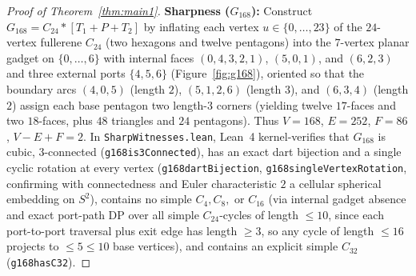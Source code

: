 \documentclass[11pt,reqno]{amsart}
\theoremstyle{plain}
\theoremstyle{definition}
\theoremstyle{remark}
\DeclareRobustCommand{\_}{\ifmmode\text{\textunderscore}\else\textunderscore\allowbreak\fi}
\begin{document}
\begin{proof}[Proof of Theorem~\ref{thm:main1}]
\textbf{Sharpness ($G_{168}$):} Construct $G_{168} = C_{24} * [T_1 + P + T_2]$ by inflating each vertex $u \in \{0,\dots,23\}$ of the $24$-vertex fullerene $C_{24}$ (two hexagons and twelve pentagons) into the $7$-vertex planar gadget on $\{0,\dots,6\}$ with internal faces $(0,4,3,2,1)$, $(5,0,1)$, and $(6,2,3)$ and three external ports $\{4,5,6\}$ (Figure~\ref{fig:g168}), oriented so that the boundary arcs $(4,0,5)$ (length $2$), $(5,1,2,6)$ (length $3$), and $(6,3,4)$ (length $2$) assign each base pentagon two length-$3$ corners (yielding twelve $17$-faces and two $18$-faces, plus $48$ triangles and $24$ pentagons). Thus $V = 168$, $E = 252$, $F = 86$, $V - E + F = 2$. In \texttt{SharpWitnesses.lean}, Lean~4 kernel-verifies that $G_{168}$ is cubic, $3$-connected (\texttt{g168\_is3Connected}), has an exact dart bijection and a single cyclic rotation at every vertex (\texttt{g168\_dartBijection}, \texttt{g168\_singleVertexRotation}, confirming with connectedness and Euler characteristic $2$ a cellular spherical embedding on $S^2$), contains no simple $C_4, C_8,$ or $C_{16}$ (via internal gadget absence and exact port-path DP over all simple $C_{24}$-cycles of length $\le 10$, since each port-to-port traversal plus exit edge has length $\ge 3$, so any cycle of length $\le 16$ projects to $\le 5 \le 10$ base vertices), and contains an explicit simple $C_{32}$ (\texttt{g168\_has\_C32}).
\end{proof}
\end{document}
